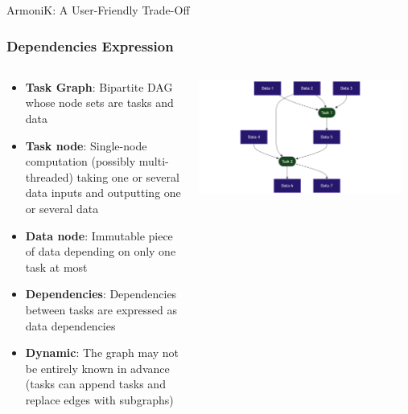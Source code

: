 \documentclass[10pt,aspectratio=1609]{beamer}
\begin{document}
\begin{section}{ArmoniK: A User-Friendly Trade-Off}
 \begin{frame}
   \frametitle{Dependencies Expression}
   \begin{columns}[T]
     \begin{column}{0.5\textwidth}
       \begin{itemize}
         \item \textbf{Task Graph}: Bipartite DAG whose node sets are tasks and data
         \item \textbf{Task node}: Single-node computation (possibly multi-threaded) taking one or several data inputs and outputting one or several data
         \item \textbf{Data node}: Immutable piece of data depending on only one task at most
         \item \textbf{Dependencies}: Dependencies between tasks are expressed as data dependencies
         \item \textbf{Dynamic}: The graph may not be entirely known in advance (tasks can append tasks and replace edges with subgraphs)
       \end{itemize}
     \end{column}
     \begin{column}{0.5\textwidth}
       \centering
       \includegraphics[width=0.95\textwidth]{mermaid-task-graph.png}
     \end{column}
   \end{columns}
 \end{frame}


\end{section}
\end{document}
